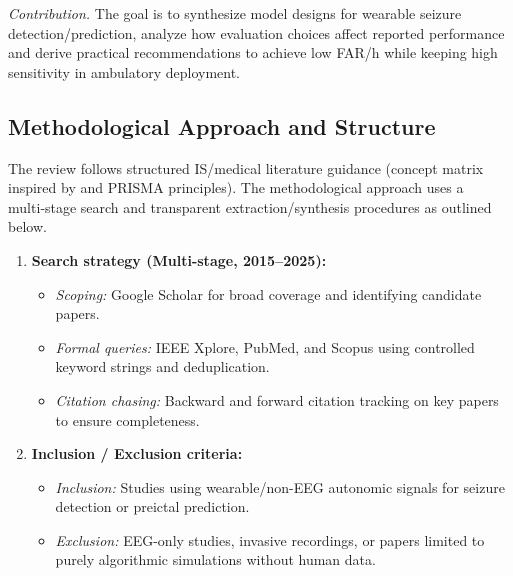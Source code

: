 \vspace{0.5em}
\noindent\textit{Contribution.} 
The goal is to synthesize model designs for wearable seizure detection/prediction, 
analyze how evaluation choices affect reported performance and derive practical
recommendations to achieve low FAR/h while keeping high sensitivity in
ambulatory deployment.

\subsection{Methodological Approach and Structure}
The review follows structured IS/medical literature guidance (concept
matrix inspired by \parencite{websterAnalyzingPastDetermine2002} and PRISMA
principles). The methodological approach uses a multi‑stage search and
transparent extraction/synthesis procedures as outlined below.

\begin{enumerate}
  \item \textbf{Search strategy (Multi-stage, 2015--2025):}
    \begin{itemize}
      \item \textit{Scoping:} Google Scholar for broad coverage and
        identifying candidate papers.
      \item \textit{Formal queries:} IEEE Xplore, PubMed, and Scopus
        using controlled keyword strings and deduplication.
      \item \textit{Citation chasing:} Backward and forward citation
        tracking on key papers to ensure completeness.
    \end{itemize}
  \item \textbf{Inclusion / Exclusion criteria:}
    \begin{itemize}
      \item \textit{Inclusion:} Studies using wearable/non-EEG autonomic
        signals for seizure detection or preictal prediction.
      \item \textit{Exclusion:} EEG-only studies, invasive recordings,
        or papers limited to purely algorithmic simulations without
        human data.
    \end{itemize}
\end{enumerate}


